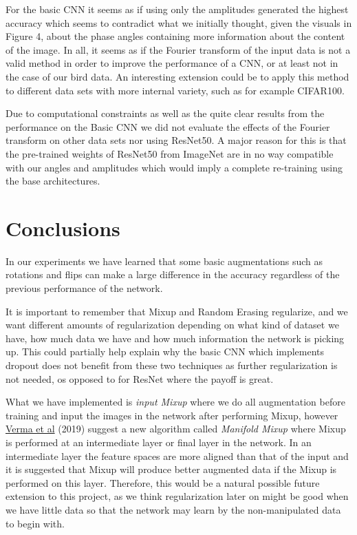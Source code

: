 \documentclass{article}
\begin{document}
For the basic CNN it seems as if using only the amplitudes generated the highest accuracy which seems to contradict what we initially thought, given the visuals in Figure 4, about the phase angles containing more information about the content of the image. In all, it seems as if the Fourier transform of the input data is not a valid method in order to improve the performance of a CNN, or at least not in the case of our bird data. An interesting extension could be to apply this method to different data sets with more internal variety, such as for example CIFAR100.

\medskip

Due to computational constraints as well as the quite clear results from the performance on the Basic CNN we 
did not evaluate the effects of the Fourier transform on other data sets nor using ResNet50. 
A major reason for this is that the pre-trained weights of ResNet50 from ImageNet are in no way 
compatible with our angles and amplitudes which would imply a complete re-training using the base architectures.

\section{Conclusions}

In our experiments we have learned that some basic augmentations such as rotations and flips can make a large difference in the accuracy regardless of the previous performance of the network.

It is important to remember that Mixup and Random Erasing regularize, and we want different amounts of regularization depending on what kind of dataset we have, how much data we have and how much information the network is picking up. This could partially help explain why the basic CNN which implements dropout does not benefit from these two techniques as further regularization is not needed, os opposed to for ResNet where the payoff is great.

What we have implemented is \textit{input Mixup} where we do all augmentation before training and input the images in the network after performing Mixup, however \href{https://arxiv.org/pdf/1806.05236.pdf}{Verma et al} (2019) 
suggest a new algorithm called \textit{Manifold Mixup} where Mixup is performed at an intermediate layer or final layer in the network. In an intermediate layer 
the feature spaces are more aligned than that of the input and it is suggested that Mixup will produce better augmented data if the Mixup is performed on this layer. Therefore, this would be 
a natural possible future extension to this project, as we think regularization later on might be good when we have little data so that the network may learn by the non-manipulated data to begin with. 
\end{document}

